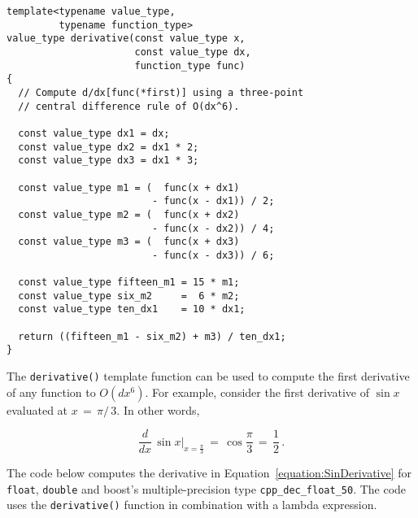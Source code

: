\documentclass{article}[11pt,draft]
\begin{document}
\begin{lstlisting}
template<typename value_type,
         typename function_type>
value_type derivative(const value_type x,
                      const value_type dx,
                      function_type func)
{
  // Compute d/dx[func(*first)] using a three-point
  // central difference rule of O(dx^6).

  const value_type dx1 = dx;
  const value_type dx2 = dx1 * 2;
  const value_type dx3 = dx1 * 3;

  const value_type m1 = (  func(x + dx1)
                         - func(x - dx1)) / 2;
  const value_type m2 = (  func(x + dx2)
                         - func(x - dx2)) / 4;
  const value_type m3 = (  func(x + dx3)
                         - func(x - dx3)) / 6;

  const value_type fifteen_m1 = 15 * m1;
  const value_type six_m2     =  6 * m2;
  const value_type ten_dx1    = 10 * dx1;

  return ((fifteen_m1 - six_m2) + m3) / ten_dx1;
}
\end{lstlisting}

The {\lstinline|derivative()|} template function can be used to compute
the first derivative of any function to $O(dx^{6})$. For example,
consider the first derivative of $\sin{x}$ evaluated at $x\,=\,\pi/\,3$.
In other words,

\begin{equation}
\dfrac{d}{dx}\,\sin{x}
\biggr\vert_{x=\frac{\pi}{3}}
\,=\, \cos{\dfrac{\pi}{3}}
\,=\, \dfrac{1}{2}\,{\text{.}}
\label{equation:SinDerivative}
\end{equation}

The code below computes the derivative in
Equation~\ref{equation:SinDerivative} for
{\lstinline|float|}, {\lstinline|double|}
and boost's multiple-precision type
{\lstinline|cpp_dec_float_50|}. The code uses the
{\lstinline|derivative()|} function in combination with
a lambda expression.
\end{document}

